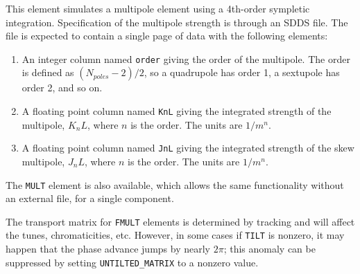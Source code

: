 \begin{raggedright}
This element simulates a multipole element using a 4th-order sympletic
integration.  
Specification of the multipole strength is through an SDDS file.
The file is expected to contain a single page of
data with the following elements:
\end{raggedright}
\begin{enumerate}
\item An integer column named {\tt order} giving the order of the multipole.
The order is defined as $(N_{poles}-2)/2$, so a quadrupole has order 1, a
sextupole has order 2, and so on.
\item A floating point column named {\tt KnL} giving the integrated strength of
the multipole, $K_n L$, where $n$ is the order.  The units are $1/m^n$.
\item A floating point column named {\tt JnL} giving the integrated strength of
the skew multipole, $J_n L$, where $n$ is the order.  The units are $1/m^n$.
\end{enumerate}

The {\tt MULT} element is also available, which allows the same functionality without an external file,
for a single component.

The transport matrix for {\tt FMULT} elements is determined by tracking and will affect the
tunes, chromaticities, etc. However, in some cases if \verb|TILT| is nonzero, it may happen that
the phase advance jumps by nearly $2\pi$; this anomaly can be suppressed by setting \verb|UNTILTED_MATRIX| to
a nonzero value.